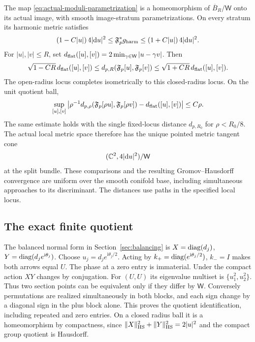 \begin{theorem}\label{thm:metric-cone}
The map \eqref{eq:actual-moduli-parametrization} is a
homeomorphism of $\overline B_R/\mathsf W$ onto its
actual image, with smooth image-stratum parametrizations.
On every stratum its harmonic metric satisfies
\begin{equation}\label{eq:diagonal-harmonic-metric}
       (1-C|u|)\,4|\mathrm d u|^2
       \le\mathfrak F_p^*g_{\rm harm}\le(1+C|u|)\,4|\mathrm d u|^2.
\end{equation}
For $|u|,|v|\le R$, set
$d_{\rm flat}([u],[v])=2\min_{\gamma\in\mathsf W}|u-\gamma v|$.
Then
\begin{equation}\label{eq:confined-distance-comparison}
 \sqrt{1-CR}\,d_{\rm flat}([u],[v])
 \le d_{p,R}(\mathfrak F_p[u],\mathfrak F_p[v])
 \le\sqrt{1+CR}\,d_{\rm flat}([u],[v]).
\end{equation}
The open-radius locus completes isometrically to this
closed-radius locus. On the unit quotient ball,
\begin{equation}\label{eq:rescaled-distance}
 \sup_{[u],[v]}
 \left|\rho^{-1}d_{p,\rho}(\mathfrak F_p[\rho u],\mathfrak F_p[\rho v])
                          -d_{\rm flat}([u],[v])\right|\le C\rho.
\end{equation}
The same estimate holds with the single fixed-locus
distance $d_{p,R_0}$ for $\rho<R_0/8$.
The actual local metric space therefore has the unique
pointed metric tangent cone
\begin{equation}\label{eq:moduli-cone}
                         (\mathbb C^2,4|\mathrm d u|^2)/\mathsf W
\end{equation}
at the split bundle. These comparisons and the resulting
Gromov--Hausdorff convergence are uniform over the smooth
conifold base, including simultaneous approaches to its
discriminant. The distances use paths in the specified
local locus.
\end{theorem}

\subsection{The exact finite quotient}

The balanced normal form in Section~\ref{sec:balancing}
is $X=\operatorname{diag}(d_j)$, $Y=\operatorname{diag}(d_je^{\mathrm i\theta_j})$.
Choose $u_j=d_je^{\mathrm i\theta_j/2}$.
Acting by $k_+=\operatorname{diag}(e^{\mathrm i\theta_j/2})$, $k_-=I$
makes both arrows equal $U$. The phase at a zero entry
is immaterial. Under the compact action $XY$ changes by
conjugation. For $(U,U)$ its eigenvalue multiset is
$\{u_1^2,u_2^2\}$. Thus two section points can be
equivalent only if they differ by $\mathsf W$.
Conversely permutations are realized simultaneously in
both blocks, and each sign change by a diagonal sign
in the plus block alone. This proves the quotient
identification, including repeated and zero entries.
On a closed radius ball it is a homeomorphism by
compactness, since
$\|X\|_{\rm HS}^2+\|Y\|_{\rm HS}^2=2|u|^2$ and
the compact group quotient is Hausdorff.

